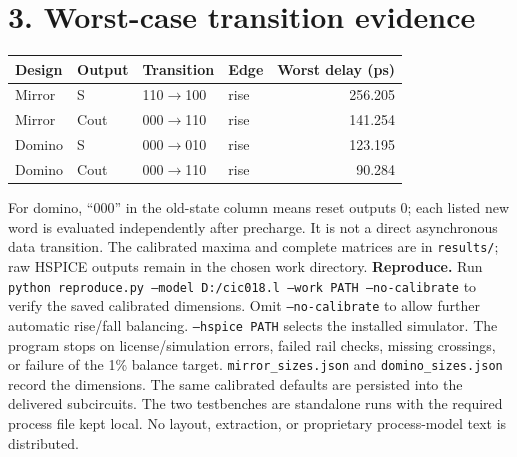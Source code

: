 \documentclass[11pt,a4paper]{article}
\begin{document}
\section*{3. Worst-case transition evidence}
\begin{center}\begin{tabular}{llllr}\toprule
Design&Output&Transition&Edge&Worst delay (ps)\\\midrule
Mirror&S&110$\to$100&rise&256.205\\
Mirror&Cout&000$\to$110&rise&141.254\\
Domino&S&000$\to$010&rise&123.195\\
Domino&Cout&000$\to$110&rise&90.284\\
\bottomrule\end{tabular}\end{center}
For domino, ``000'' in the old-state column means reset outputs 0; each listed new word is evaluated independently after precharge. It is not a direct asynchronous data transition. The calibrated maxima and complete matrices are in \texttt{results/}; raw HSPICE outputs remain in the chosen work directory.
\textbf{Reproduce.} Run \texttt{python reproduce.py --model D:/cic018.l --work PATH --no-calibrate} to verify the saved calibrated dimensions. Omit \texttt{--no-calibrate} to allow further automatic rise/fall balancing. \texttt{--hspice PATH} selects the installed simulator. The program stops on license/simulation errors, failed rail checks, missing crossings, or failure of the 1\% balance target.
\texttt{mirror\_sizes.json} and \texttt{domino\_sizes.json} record the dimensions. The same calibrated defaults are persisted into the delivered subcircuits. The two testbenches are standalone runs with the required process file kept local. No layout, extraction, or proprietary process-model text is distributed.
\end{document}
